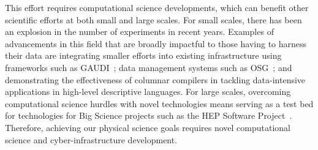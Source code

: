 This effort requires computational science developments, which can benefit other scientific efforts at both small and large scales. For small scales, there has been an explosion in the number of experiments in recent years. Examples of advancements in this field that are broadly impactful to those having to harness their data are integrating smaller efforts into existing infrastructure using frameworks such as GAUDI~\cite{Barrand:2001ny}; data management systems such as OSG~\cite{Jayatilaka:2017twe}; and demonstrating the effectiveness of columnar compilers in tackling data-intensive applications in high-level descriptive languages. For large scales, overcoming computational science hurdles with novel technologies means serving as a test bed for technologies for Big Science projects such as the HEP Software Project~\cite{Alves:2017she}. Therefore, achieving our physical science goals requires novel computational science and cyber-infrastructure development.


